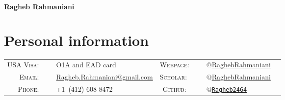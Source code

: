 \documentclass[10PT,letter]{article}
\title{}
\newcommand{\numbox}[1]{} %
\begin{document}
\noindent{}%
{
	\fontsize{34}{36}\mdseries\upshape\sffamily\bfseries Ragheb Rahmaniani
}

\vspace{1.0cm}

\section*{\numbox{1}\bfseries\textcolor{titlecol}{\sffamily Personal information}}
              \begin{tabular}{rlcrl}
	               \small\textsc{USA Visa:}~~~ & \small O1A and EAD card  	
	               																					& \small\textsc{Webpage:}~~~ &  \multicolumn{1}{l}{
	               																						\small \href{https://sites.google.com/view/raghebrahmaniani/home}{{$@$RaghebRahmaniani }}
	               																					}
	               \\[.5mm]
	               
	                \small\textsc{Email:}~~~ & \small {\href{mailto:ragheb.rahmaniani@gmail.com}{Ragheb.Rahmaniani@gmail.com}}   
	                																				& \small\textsc{Scholar:} ~~~ &  \multicolumn{1}{l}{
	                																					\small  \small\href{https://scholar.google.com/citations?user=3V2o0Q0AAAAJ\&hl=en}{$@$RaghebRahmaniani}
	                																				}
	                \\[.5mm]
	                \small\textsc{Phone:}~~~ & \small +1~(412)-608-8472   
	                																				&  \small\textsc{Github:}~~~ & \multicolumn{1}{l}{
	                																					\small \small\href{https://github.com/Ragheb2464}{\texttt{$@$Ragheb2464}}  
                																					}
					\\[.5mm]	               
              \end{tabular}
\end{document}
